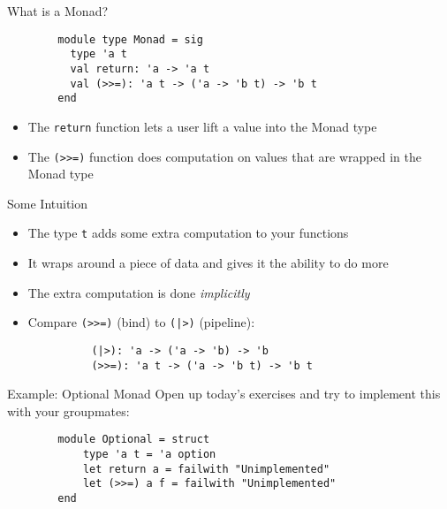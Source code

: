 \documentclass{beamer}
\begin{document}
    \begin{frame}[fragile]{What is a Monad?}
        
        \begin{verbatim}
        module type Monad = sig
          type 'a t
          val return: 'a -> 'a t
          val (>>=): 'a t -> ('a -> 'b t) -> 'b t
        end
        \end{verbatim}
    \begin{itemize}
        \item The \texttt{return} function lets a user lift a value into the Monad type \pause
        \item The \texttt{(>>=)} function does computation on values that are wrapped in the Monad type
    \end{itemize}
    \end{frame}
    
    
    \begin{frame}[fragile]{Some Intuition}
    \begin{itemize}
        \item The type \texttt{t} adds some extra computation to your functions \pause
        \item It wraps around a piece of data and gives it the ability to do more \pause
        \item The extra computation is done \textit{implicitly} \pause
        \item Compare \texttt{(>>=)} (bind) to \texttt{(|>)} (pipeline):
        
        
        \begin{verbatim}
          (|>): 'a -> ('a -> 'b) -> 'b
          (>>=): 'a t -> ('a -> 'b t) -> 'b t
        \end{verbatim}
    \end{itemize}
    \end{frame}
    
    
    \begin{frame}[fragile]{Example: Optional Monad}
        Open up today's exercises and try to implement this with your groupmates:
        
        \begin{verbatim}
        module Optional = struct
            type 'a t = 'a option
            let return a = failwith "Unimplemented"
            let (>>=) a f = failwith "Unimplemented"
        end
        \end{verbatim}
    \end{frame}
    
\end{document}
